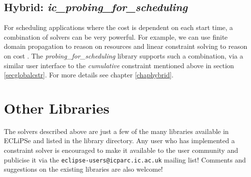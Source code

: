 \subsection{Hybrid: {\em ic\_probing\_for\_scheduling}}
\label{shortsecprobing}
For scheduling applications where the cost is dependent on each start
time, a combination of solvers can be very powerful.
For example, we can use finite domain
propagation to reason on 
resources and linear constraint solving to reason on cost \cite{HaniProbe}.
The {\em probing\_for\_scheduling} library supports such a combination,
via a similar user interface to the {\em cumulative} constraint mentioned
above in section \ref{secglobalcstr}.
For more details see chapter \ref{chaphybrid}.


\section{Other Libraries}
The solvers described above are just a few of the many libraries
available in ECLiPSe and listed in the \eclipse{} library directory.
Any \eclipse{} user who has implemented a constraint solver is
encouraged to make it available to the user community and publicise
it via the {\tt eclipse-users@icparc.ic.ac.uk} mailing list!
Comments and suggestions on the existing libraries are also welcome!


%
%

%

